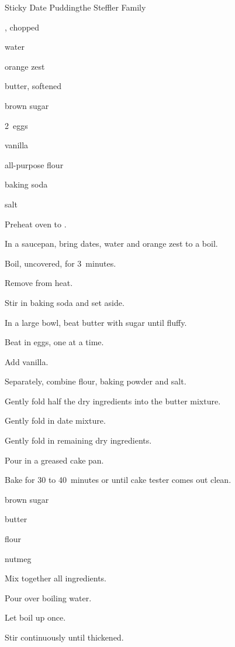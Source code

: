 \begin{recipe}{Sticky Date Pudding}{the Steffler Family}{}

\begin{ingredients}
\item \C{1\threequarter} , chopped
\item {} water
\item {} orange zest
\item \C{\half} butter, softened
\item \C{\third} brown sugar
\item 2~eggs
\item {} vanilla
\item \C{1\quarter} all-purpose flour
\item {} baking soda
\item \tp{\half} salt
\end{ingredients}

\begin{directions}
\item Preheat oven to .
\item In a saucepan, bring dates, water and orange zest to a boil.
\item Boil, uncovered, for 3~minutes.
\item Remove from heat.
\item Stir in baking soda and set aside.
\item In a large bowl, beat butter with sugar until fluffy.
\item Beat in eggs, one at a time.
\item Add vanilla.
\item Separately, combine flour, baking powder and salt.
\item Gently fold half the dry ingredients into the butter mixture.
\item Gently fold in date mixture.
\item Gently fold in remaining dry ingredients.
\item Pour in a greased cake pan.
\item Bake for 30 to 40~minutes or until cake tester comes out clean.
\end{directions}


\begin{ingredients}
\item {} brown sugar
\item {} butter
\item {} flour
\item nutmeg
\end{ingredients}

\begin{directions}
\item Mix together all ingredients.
\item Pour over  boiling water.
\item Let boil up once.
\item Stir continuously until thickened.
\end{directions}
\end{recipe}

